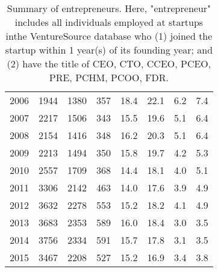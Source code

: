 \begin{table}[ht]
\begin{tabular}{p{1.75cm}p{1.75cm}p{1.75cm}p{1.75cm}p{1.75cm}p{1.75cm}p{1.75cm}p{1.75cm}}
  2006 & 1944 & 1380 & 357 & 18.4 & 22.1 & 6.2 & 7.4 \\ 
  2007 & 2217 & 1506 & 343 & 15.5 & 19.6 & 5.1 & 6.4 \\ 
  2008 & 2154 & 1416 & 348 & 16.2 & 20.3 & 5.1 & 6.4 \\ 
  2009 & 2213 & 1494 & 350 & 15.8 & 19.7 & 4.2 & 5.3 \\ 
  2010 & 2557 & 1709 & 368 & 14.4 & 18.1 & 4.0 & 5.1 \\ 
  2011 & 3306 & 2142 & 463 & 14.0 & 17.6 & 3.9 & 4.9 \\ 
  2012 & 3632 & 2278 & 553 & 15.2 & 18.2 & 4.1 & 4.9 \\ 
  2013 & 3683 & 2353 & 589 & 16.0 & 18.4 & 3.0 & 3.5 \\ 
  2014 & 3756 & 2334 & 591 & 15.7 & 17.8 & 3.1 & 3.5 \\ 
  2015 & 3467 & 2208 & 527 & 15.2 & 16.9 & 3.4 & 3.8 \\ 
   \bottomrule
\end{tabular}
\endgroup
\caption{Summary of entrepreneurs. Here, "entrepreneur" includes all individuals employed at startups inthe VentureSource database who (1) joined the startup within 1 year(s) of its founding year; and (2) have the title of CEO, CTO, CCEO, PCEO, PRE, PCHM, PCOO, FDR.} 
\end{table}
